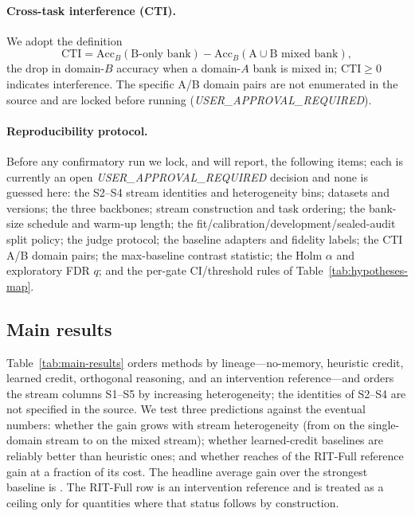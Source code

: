 \paragraph{Cross-task interference (CTI).}
We adopt the definition
\begin{equation}
\mathrm{CTI} = \mathrm{Acc}_B(\text{B-only bank}) - \mathrm{Acc}_B(\text{A}\cup\text{B mixed bank}),
\end{equation}
the drop in domain-$B$ accuracy when a domain-$A$ bank is mixed in; $\mathrm{CTI}\ge0$
indicates interference. The specific A/B domain pairs are not enumerated in the
source and are locked before running (\emph{USER\_APPROVAL\_REQUIRED}).

\paragraph{Reproducibility protocol.}
Before any confirmatory run we lock, and will report, the following items; each is
currently an open \emph{USER\_APPROVAL\_REQUIRED} decision and none is guessed here:
the S2--S4 stream identities and heterogeneity bins; datasets and versions; the
three backbones; stream construction and task ordering; the bank-size schedule and
warm-up length; the fit/calibration/development/sealed-audit split policy; the judge
protocol; the baseline adapters and fidelity labels; the CTI A/B domain pairs; the
max-baseline contrast statistic; the Holm $\alpha$ and exploratory FDR $q$; and the
per-gate CI/threshold rules of Table~\ref{tab:hypotheses-map}.

\subsection{Main results}
Table~\ref{tab:main-results} orders methods by lineage---no-memory, heuristic
credit, learned credit, orthogonal reasoning, and an intervention reference---and
orders the stream columns S1--S5 by increasing heterogeneity; the identities of
S2--S4 are not specified in the source. We test three predictions against the
eventual numbers: whether the gain grows with stream heterogeneity (from
 on the single-domain stream to
 on the mixed stream); whether learned-credit
baselines are reliably better than heuristic ones; and whether \method{} reaches
 of the RIT-Full reference gain at a fraction
of its cost. The headline average gain over the strongest baseline is
. The RIT-Full row is an intervention
reference and is treated as a ceiling only for quantities where that status
follows by construction.

